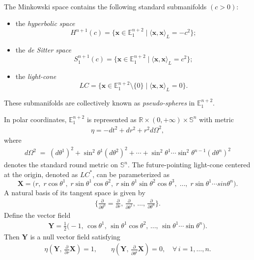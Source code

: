 \documentclass[reqno,11pt, letterpaper]{amsart}
\def\R{{\mathbb R}}
\def\E{{\mathbb E}}
\theoremstyle{plain}
\theoremstyle{definition}
\def\Bbb#1{{\mathbb#1}}
\def\R{\Bbb R}  \def\C{\Bbb C}
\def\S{\Bbb S}
\numberwithin{equation}{section}
\begin{document}
The Minkowski space contains the following standard submanifolds $(c>0)$:
\begin{itemize}
	\item the {\it hyperbolic space}
	\[
	H^{n+1}(c)=\{\mathbf{x}\in\E^{n+2}_1 \mid \langle\mathbf{x},\mathbf{x}\rangle_L=-c^2\};
	\]
	\item the {\it de Sitter space}
	\[
	S^{n+1}_1(c)=\{\mathbf{x}\in\E^{n+2}_1 \mid \langle\mathbf{x},\mathbf{x}\rangle_L=c^2\};
	\]
	\item the {\it light-cone}
	\[
	LC=\{\mathbf{x}\in\E^{n+2}_1\setminus\{0\} \mid \langle\mathbf{x},\mathbf{x}\rangle_L=0\}.
	\]
\end{itemize}
These submanifolds are collectively known as {\it pseudo-spheres} in $\E^{n+2}_1$.

In polar coordinates, $\E^{n+2}_1$ is represented as $\R\times(0,+\infty)\times\S^n$ with metric
\begin{align*}\label{etadef}
	\eta=-dt^2+dr^2+r^2d\Omega^2,
\end{align*}
where
\begin{align*}
	d\Omega^2\;=\;(d\theta^1)^2+\sin^2\theta^1(d\theta^2)^2+\cdots+\sin^2\theta^1\cdots\sin^2\theta^{n-1}(d\theta^n)^2
\end{align*}
denotes the standard round metric on $\S^n$.
The future-pointing light-cone centered at the origin, denoted as $LC^*$, can be parameterized as
\[
\mathbf{X}=\bigl(r,\; r\cos\theta^1,\; r\sin\theta^1\cos\theta^2,\; r\sin\theta^1\sin\theta^2\cos\theta^3,\;\ldots,\; r\sin\theta^1\cdots sin\theta^n \bigr).
\]
A natural basis of its tangent space is given by  
\begin{align*}
	\Biggl\{ \frac{\partial}{\partial \theta^0} = \frac{\partial}{\partial r},\,
	\frac{\partial}{\partial \theta^1},\,\ldots,\,
	\frac{\partial}{\partial \theta^n} \Biggr\}.
\end{align*}
Define the vector field  
\begin{align*}
	\mathbf{Y} = \tfrac{1}{2}\bigl(-1,\, \cos\theta^1,\, 
	\sin\theta^1\cos\theta^2,\, \ldots,\, 
	\sin\theta^1\cdots\sin\theta^n\bigr).
\end{align*}
Then $\mathbf{Y}$ is a null vector field satisfying
\begin{align*}
	\eta\!\left(\mathbf{Y},\,\frac{\partial}{\partial r}\mathbf{X}\right) = 1, \qquad
	\eta\!\left(\mathbf{Y},\,\frac{\partial}{\partial \theta^i}\mathbf{X}\right) = 0, 
	\quad \forall\, i=1,\ldots,n.
\end{align*}
\end{document}
